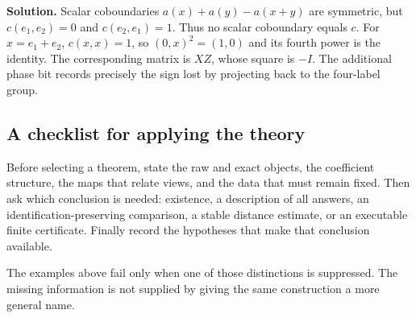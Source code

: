 \textbf{Solution.} Scalar coboundaries $a(x)+a(y)-a(x+y)$ are symmetric, but $c(e_1,e_2)=0$ and $c(e_2,e_1)=1$. Thus no scalar coboundary equals $c$. For $x=e_1+e_2$, $c(x,x)=1$, so $(0,x)^2=(1,0)$ and its fourth power is the identity. The corresponding matrix is $XZ$, whose square is $-I$. The additional phase bit records precisely the sign lost by projecting back to the four-label group.

\subsection*{A checklist for applying the theory}
Before selecting a theorem, state the raw and exact objects, the coefficient structure, the maps that relate views, and the data that must remain fixed. Then ask which conclusion is needed: existence, a description of all answers, an identification-preserving comparison, a stable distance estimate, or an executable finite certificate. Finally record the hypotheses that make that conclusion available.

The examples above fail only when one of those distinctions is suppressed. The missing information is not supplied by giving the same construction a more general name.
